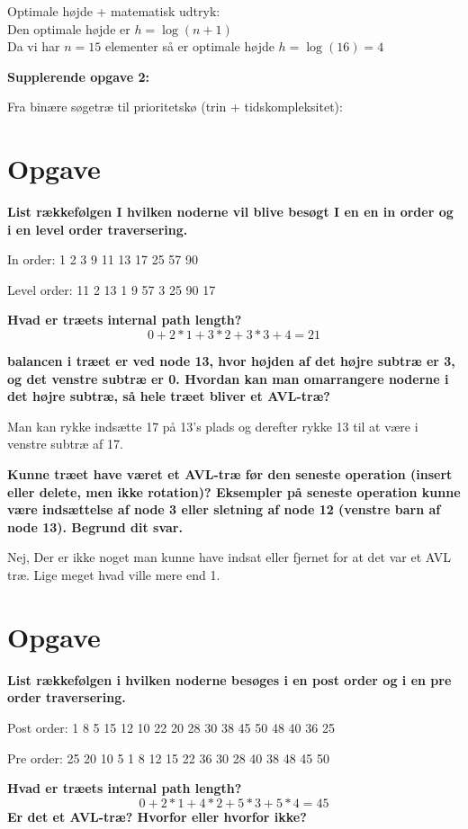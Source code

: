 \documentclass{article}
\begin{document}
Optimale højde + matematisk udtryk:\\
Den optimale højde er $h = \log{(n + 1)}$\\
Da vi har $n=15$ elementer så er optimale højde $h = \log{(16)}=4$

\textbf{Supplerende opgave 2:}

Fra binære søgetræ til prioritetskø (trin + tidskompleksitet):


\section{Opgave} %
\textbf{List rækkefølgen I hvilken noderne vil blive besøgt I en en in order og i en level order traversering.}

In order: 1 2 3 9 11 13 17 25 57 90

Level order: 11 2 13 1 9 57 3 25 90 17

\textbf{Hvad er træets internal path length?}  
$$0 + 2 * 1 + 3 * 2 + 3 * 3 + 4 = 21$$

\textbf{balancen i træet er ved node 13, hvor højden af det højre subtræ er 3, og det venstre subtræ er 0.
Hvordan kan man omarrangere noderne i det højre subtræ, så hele træet bliver et AVL-træ?}

Man kan rykke indsætte 17 på 13's plads og derefter rykke 13 til at være i venstre subtræ af 17.
 
\textbf{Kunne træet have været et AVL-træ før den seneste operation (insert eller delete, men ikke rotation)? 
Eksempler på seneste operation kunne være indsættelse af node 3 eller sletning af node 12 (venstre barn af 
node 13). Begrund dit svar.}

Nej, Der er ikke noget man kunne have indsat eller fjernet for at det var et AVL træ. Lige meget hvad ville mere end 1.

\section{Opgave} %
\textbf{List rækkefølgen i hvilken noderne besøges i en post order og i en pre order traversering.}

Post order: 1 8 5 15 12 10 22 20 28 30 38 45 50 48 40 36 25

Pre order: 25 20 10 5 1 8 12 15 22 36 30 28 40 38 48 45 50

\textbf{Hvad er træets internal path length?}
$$0 + 2 * 1 + 4 * 2 + 5 * 3 + 5 * 4 = 45$$
\textbf{Er det et AVL-træ? Hvorfor eller hvorfor ikke?}
\end{document}
